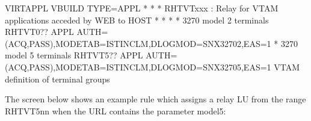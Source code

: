 \documentclass[letterpaper,10pt,english]{sphinxmanual}
\begin{document}
\begin{sphinxVerbatim}[commandchars=\\\{\}]
VIRTAPPL VBUILD TYPE=APPL
* \PYGZhy{}\PYGZhy{}\PYGZhy{}\PYGZhy{}\PYGZhy{}\PYGZhy{}\PYGZhy{}\PYGZhy{}\PYGZhy{}\PYGZhy{}\PYGZhy{}\PYGZhy{}\PYGZhy{}\PYGZhy{}\PYGZhy{}\PYGZhy{}\PYGZhy{}\PYGZhy{}\PYGZhy{}\PYGZhy{}\PYGZhy{}\PYGZhy{}\PYGZhy{}\PYGZhy{}\PYGZhy{}\PYGZhy{}\PYGZhy{}\PYGZhy{}\PYGZhy{}\PYGZhy{}\PYGZhy{}\PYGZhy{}\PYGZhy{}\PYGZhy{}\PYGZhy{}\PYGZhy{}\PYGZhy{}\PYGZhy{}\PYGZhy{}\PYGZhy{}\PYGZhy{}\PYGZhy{}\PYGZhy{}\PYGZhy{}\PYGZhy{}\PYGZhy{}\PYGZhy{}\PYGZhy{}\PYGZhy{}\PYGZhy{}\PYGZhy{}\PYGZhy{}\PYGZhy{}\PYGZhy{}\PYGZhy{}\PYGZhy{}\PYGZhy{}\PYGZhy{}\PYGZhy{}\PYGZhy{}\PYGZhy{}\PYGZhy{}\PYGZhy{}\PYGZhy{}\PYGZhy{}\PYGZhy{} *
* RHTVTxxx : Relay for VTAM applications acceded by WEB to HOST *
* \PYGZhy{}\PYGZhy{}\PYGZhy{}\PYGZhy{}\PYGZhy{}\PYGZhy{}\PYGZhy{}\PYGZhy{}\PYGZhy{}\PYGZhy{}\PYGZhy{}\PYGZhy{}\PYGZhy{}\PYGZhy{}\PYGZhy{}\PYGZhy{}\PYGZhy{}\PYGZhy{}\PYGZhy{}\PYGZhy{}\PYGZhy{}\PYGZhy{}\PYGZhy{}\PYGZhy{}\PYGZhy{}\PYGZhy{}\PYGZhy{}\PYGZhy{}\PYGZhy{}\PYGZhy{}\PYGZhy{}\PYGZhy{}\PYGZhy{}\PYGZhy{}\PYGZhy{}\PYGZhy{}\PYGZhy{}\PYGZhy{}\PYGZhy{}\PYGZhy{}\PYGZhy{}\PYGZhy{}\PYGZhy{}\PYGZhy{}\PYGZhy{}\PYGZhy{}\PYGZhy{}\PYGZhy{}\PYGZhy{}\PYGZhy{}\PYGZhy{}\PYGZhy{}\PYGZhy{}\PYGZhy{}\PYGZhy{}\PYGZhy{}\PYGZhy{}\PYGZhy{}\PYGZhy{}\PYGZhy{}\PYGZhy{}\PYGZhy{}\PYGZhy{}\PYGZhy{}\PYGZhy{}\PYGZhy{} *
* 3270 model 2 terminals
RHTVT0?? APPL AUTH=(ACQ,PASS),MODETAB=ISTINCLM,DLOGMOD=SNX32702,EAS=1
* 3270 model 5 terminals
RHTVT5?? APPL AUTH=(ACQ,PASS),MODETAB=ISTINCLM,DLOGMOD=SNX32705,EAS=1
VTAM definition of terminal groups
\end{sphinxVerbatim}

The screen below shows an example rule which assigns a relay LU from the range RHTVT5nn when the URL contains the parameter model5:
\end{document}
